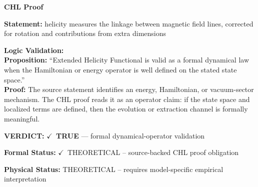 \vspace{0.45em}
\noindent\textbf{CHL Proof}\par
\textbf{Statement:} helicity measures the linkage between magnetic field lines, corrected for rotation and
contributions from extra dimensions

\textbf{Logic Validation:}\\
\textbf{Proposition:} ``Extended Helicity Functional is valid as a formal dynamical law when the Hamiltonian or
energy operator is well defined on the stated state space.''\\
\textbf{Proof:} The source statement identifies an energy, Hamiltonian, or vacuum-sector mechanism. The
CHL proof reads it as an operator claim: if the state space and localized terms are
defined, then the evolution or extraction channel is formally meaningful.

\textbf{VERDICT:} \ensuremath{\checkmark}\ \textbf{TRUE} --- formal dynamical-operator validation

\textbf{Formal Status:} \ensuremath{\checkmark}\ THEORETICAL -- source-backed CHL proof obligation

\textbf{Physical Status:} THEORETICAL -- requires model-specific empirical interpretation
\par\vspace{0.45em}
\par
\ifTZPDarkEdition
{}
\fi
\endgroup
\endgroup
